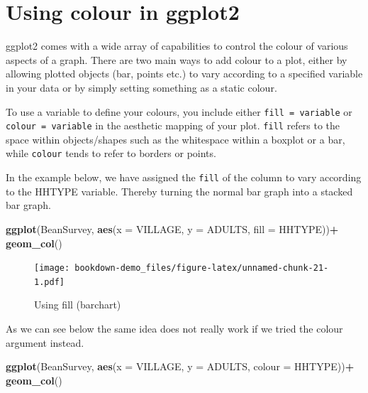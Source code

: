 \documentclass[
]{book}
\newenvironment{Shaded}{\begin{snugshade}}{\end{snugshade}}
\newcommand{\DataTypeTok}[1]{\textcolor[rgb]{0.13,0.29,0.53}{#1}}
\newcommand{\KeywordTok}[1]{\textcolor[rgb]{0.13,0.29,0.53}{\textbf{#1}}}
\newcommand{\NormalTok}[1]{#1}
\newcommand{\OperatorTok}[1]{\textcolor[rgb]{0.81,0.36,0.00}{\textbf{#1}}}
\newcommand{\StringTok}[1]{\textcolor[rgb]{0.31,0.60,0.02}{#1}}
\begin{document}
\hypertarget{using-colour-in-ggplot2}{%
\section{Using colour in ggplot2}\label{using-colour-in-ggplot2}}

ggplot2 comes with a wide array of capabilities to control the colour of various aspects of a graph. There are two main ways to add colour to a plot, either by allowing plotted objects (bar, points etc.) to vary according to a specified variable in your data or by simply setting something as a static colour.

To use a variable to define your colours, you include either \texttt{fill\ =\ variable} or \texttt{colour\ =\ variable} in the aesthetic mapping of your plot. \texttt{fill} refers to the space within objects/shapes such as the whitespace within a boxplot or a bar, while \texttt{colour} tends to refer to borders or points.

In the example below, we have assigned the \texttt{fill} of the column to vary according to the HHTYPE variable. Thereby turning the normal bar graph into a stacked bar graph.

\begin{Shaded}
\begin{Highlighting}[]
\KeywordTok{ggplot}\NormalTok{(BeanSurvey, }\KeywordTok{aes}\NormalTok{(}\DataTypeTok{x =}\NormalTok{ VILLAGE, }\DataTypeTok{y =}\NormalTok{ ADULTS, }\DataTypeTok{fill =}\NormalTok{ HHTYPE))}\OperatorTok{+}
\StringTok{  }\KeywordTok{geom_col}\NormalTok{()}
\end{Highlighting}
\end{Shaded}

\begin{figure}
\centering
\texttt{[image: bookdown-demo\_files/figure-latex/unnamed-chunk-21-1.pdf]}
\caption{\label{fig:unnamed-chunk-21}Using fill (barchart)}
\end{figure}

As we can see below the same idea does not really work if we tried the colour argument instead.

\begin{Shaded}
\begin{Highlighting}[]
\KeywordTok{ggplot}\NormalTok{(BeanSurvey, }\KeywordTok{aes}\NormalTok{(}\DataTypeTok{x =}\NormalTok{ VILLAGE, }\DataTypeTok{y =}\NormalTok{ ADULTS, }\DataTypeTok{colour =}\NormalTok{ HHTYPE))}\OperatorTok{+}
\StringTok{  }\KeywordTok{geom_col}\NormalTok{()}
\end{Highlighting}
\end{Shaded}
\end{document}
